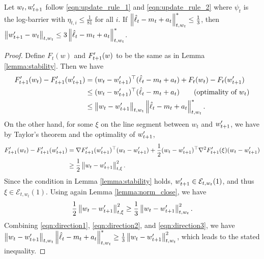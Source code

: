\begin{lemma}
\label{lemma:stability_under_condition}
Let $w_t, w_{t+1}^\prime$ follow \eqref{eqn:update_rule_1} and \eqref{eqn:update_rule_2} where $\psi_t$ is the log-barrier with $\eta_{t,i}\leq \frac{1}{81}$ for all $i$. If $\left\lVert\hat{\ell}_t-m_t+a_t\right\rVert^*_{t,w_t}\leq \frac{1}{3}$, then $\left\lVert w_{t+1}^\prime-w_t\right\rVert_{t,w_t}\leq 3\left\lVert\hat{\ell}_t-m_t+a_t\right\rVert_{t,w_t}^*$. 
\end{lemma}
\begin{proof}
Define $F_t(w)$ and $F_{t+1}^\prime(w)$ to be the same as in Lemma \ref{lemma:stability}. Then we have 
\begin{align}
F_{t+1}^\prime(w_t)-F_{t+1}^\prime(w_{t+1}^\prime)&=(w_t-w_{t+1}^\prime)^\top(\hat{\ell}_t-m_t+a_t) + F_t(w_t)-F_t(w_{t+1}^\prime) \nonumber \\
&\leq (w_t-w_{t+1}^\prime)^\top(\hat{\ell}_t-m_t+a_t) \nonumber \tag{optimality of $w_t$}\\
&\leq \left\lVert w_t-w_{t+1}^\prime\right\rVert_{t,w_t}\left\lVert\hat{\ell}_t-m_t+a_t\right\rVert_{t,w_t}^*. \label{eqn:direction1}
\end{align}
On the other hand, for some $\xi$ on the line segment between $w_t$ and $w_{t+1}^\prime$, we have by Taylor's theorem and the optimality of $w_{t+1}^\prime$,
\begin{align}
F_{t+1}^\prime(w_t)-F_{t+1}^\prime(w_{t+1}^\prime)&=\nabla F_{t+1}^\prime(w_{t+1}^\prime)^\top (w_t-w_{t+1}^\prime) + \frac{1}{2}(w_t-w_{t+1}^\prime)^\top \nabla^2 F_{t+1}^\prime(\xi)(w_t-w_{t+1}^\prime) \nonumber \\
&\geq \frac{1}{2}\left\lVert w_t-w_{t+1}^\prime\right\rVert_{t,\xi}^2 .
\label{eqn:direction2}
\end{align}
Since the condition in Lemma \ref{lemma:stability} holds, $w_{t+1}^\prime\in \mathcal{E}_{t,w_t}(1)$, and thus $\xi\in \mathcal{E}_{t,w_t}(1)$. Using again Lemma \ref{lemma:norm_close}, we have 
\begin{align}
\frac{1}{2}\left\lVert w_t-w_{t+1}^\prime\right\rVert_{t,\xi}^2 \geq \frac{1}{3}\left\lVert w_t-w_{t+1}^\prime\right\rVert_{t,w_t}^2\label{eqn:direction3}.
\end{align}
Combining \eqref{eqn:direction1}, \eqref{eqn:direction2}, and \eqref{eqn:direction3}, we have $\left\lVert w_t-w_{t+1}^\prime\right\rVert_{t,w_t}\left\lVert\hat{\ell}_t-m_t+a_t\right\rVert_{t,w_t}^* \geq \frac{1}{3}\left\lVert w_t-w_{t+1}^\prime\right\rVert_{t,w_t}^2$, which leads to the stated inequality. 
\end{proof}

